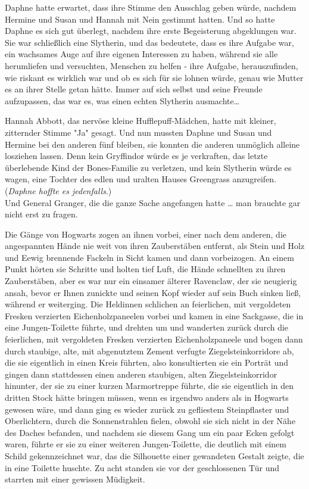 {Daphne hatte erwartet, dass ihre Stimme den Ausschlag geben würde, nachdem Hermine und Susan und Hannah mit Nein gestimmt hatten. Und so hatte Daphne es sich gut überlegt, nachdem ihre erste Begeisterung abgeklungen war. Sie war schließlich eine Slytherin, und das bedeutete, dass es ihre Aufgabe war, ein wachsames Auge auf ihre eigenen Interessen zu haben, während sie alle herumliefen und versuchten, Menschen zu helfen - ihre Aufgabe, herauszufinden, wie riskant es wirklich war und ob es sich für sie lohnen würde, genau wie Mutter es an ihrer Stelle getan hätte. Immer auf sich selbst und seine Freunde aufzupassen, das war es, was einen echten Slytherin ausmachte…

Hannah Abbott, das nervöse kleine Hufflepuff-Mädchen, hatte mit kleiner, zitternder Stimme "Ja" gesagt. Und nun mussten Daphne und Susan und Hermine bei den anderen fünf bleiben, sie konnten die anderen unmöglich alleine losziehen lassen. Denn kein Gryffindor würde es je verkraften, das letzte überlebende Kind der Bones-Familie zu verletzen, und kein Slytherin würde es wagen, eine Tochter des edlen und uralten Hauses Greengrass anzugreifen. (\emph{Daphne hoffte es jedenfalls}.)\\ Und General Granger, die die ganze Sache angefangen hatte … man brauchte gar nicht erst zu fragen.

Die Gänge von Hogwarts zogen an ihnen vorbei, einer nach dem anderen, die angespannten Hände nie weit von ihren Zauberstäben entfernt, als Stein und Holz und Eewig brennende Fackeln in Sicht kamen und dann vorbeizogen. An einem Punkt hörten sie Schritte und holten tief Luft, die Hände schnellten zu ihren Zauberstäben, aber es war nur ein einsamer älterer Ravenclaw, der sie neugierig ansah, bevor er Ihnen zunickte und seinen Kopf wieder auf sein Buch sinken ließ, während er weiterging. Die Heldinnen schlichen an feierlichen, mit vergoldeten Fresken verzierten Eichenholzpaneelen vorbei und kamen in eine Sackgasse, die in eine Jungen-Toilette führte, und drehten um und wanderten zurück durch die feierlichen, mit vergoldeten Fresken verzierten Eichenholzpaneele und bogen dann durch staubige, alte, mit abgenutztem Zement verfugte Ziegelsteinkorridore ab, die sie eigentlich in einen Kreis führten, also konsultierten sie ein Porträt und gingen dann stattdessen einen anderen staubigen, alten Ziegelsteinkorridor hinunter, der sie zu einer kurzen Marmortreppe führte, die sie eigentlich in den dritten Stock hätte bringen müssen, wenn es irgendwo anders als in Hogwarts gewesen wäre, und dann ging es wieder zurück zu gefliestem Steinpflaster und Oberlichtern, durch die Sonnenstrahlen fielen, obwohl sie sich nicht in der Nähe des Daches befanden, und nachdem sie diesem Gang um ein paar Ecken gefolgt waren, führte er sie zu einer weiteren Jungen-Toilette, die deutlich mit einem Schild gekennzeichnet war, das die Silhouette einer gewandeten Gestalt zeigte, die in eine Toilette huschte. Zu acht standen sie vor der geschlossenen Tür und starrten mit einer gewissen Müdigkeit.

}
